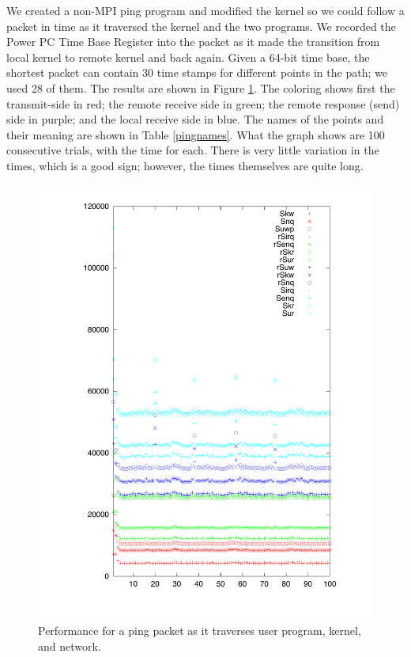 \documentclass[a4,10pt,preprint]{sigplanconf}
\begin{document}
We created a non-MPI ping program and modified the kernel so we could follow a packet in time as it
traversed the kernel and the two programs. We recorded the Power PC Time Base Register into the
packet as it made the transition from local kernel to remote kernel and back again. Given a 64-bit
time base, the shortest packet can contain 30 time stamps for different points in the path; we used
28 of them. The results are shown in Figure  \ref{pingpongcurry}. The coloring shows first the transmit-side in red; the remote receive side in green; the remote response (send) side in purple; and the local receive side in blue. The names of the points and their meaning are shown in Table  \ref{pingnames}. What the graph shows are 100 consecutive trials, with the time for each. There is very little variation in the times, which is a good sign; however, the times themselves are quite long.
 \begin{figure}
\includegraphics[width=.5\textwidth]{pingpongcurry.pdf} 
\caption{\label{pingpongcurry}Performance for a ping packet as it traverses user program, kernel, and network.}
\end{figure}
\end{document}
